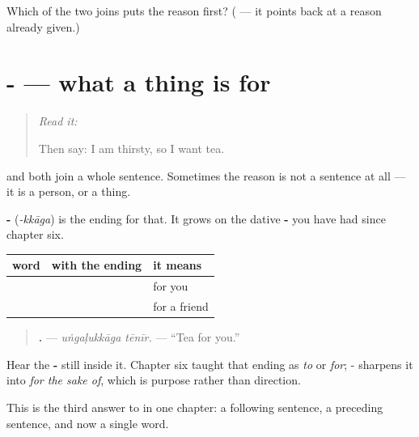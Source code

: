 \begin{tcolorbox}[breakable,colback=teal!4,colframe=teal!35!black,title={Before you move on}]
Which of the two joins puts the reason first? (\textbf{} — it points back at a reason already given.)
\end{tcolorbox}
\section[\texorpdfstring{-\ta{க்காக} (-kkāga)}{-க்காக (-kkāga)}]{- — what a thing is for}

\label{lesson:TA-C78-for-the-sake-of}



\begin{quote}
\emph{Read it:} \textbf{}

Then say: I am thirsty, so I want tea.
\end{quote}

\begin{grammarlens}[title={Grammar lens: a reason that is not a sentence}]
 and  both join a whole sentence. Sometimes the reason is not a sentence at all — it is a person, or a thing.

\textbf{-} (\emph{-kkāga}) is the ending for that. It grows on the dative \textbf{-} you have had since chapter six.

\noindent
\begin{tabularx}{\linewidth}{@{}>{\raggedright\arraybackslash}X>{\raggedright\arraybackslash}X>{\raggedright\arraybackslash}X@{}}
\toprule
\textbf{word} & \textbf{with the ending} & \textbf{it means} \\
\midrule
\ta{உங்கள்} & \textbf{\ta{உங்களுக்காக}} & for you \\
\ta{நண்பன்} & \textbf{\ta{நண்பனுக்காக}} & for a friend \\
\bottomrule
\end{tabularx}

\begin{quote}
\textbf{ .} — \emph{uṅgaḷukkāga tēnīr.} — \textquotedblleft{}Tea for you.\textquotedblright{}
\end{quote}

Hear the \textbf{-} still inside it. Chapter six taught that ending as \emph{to} or \emph{for}; - sharpens it into \emph{for the sake of}, which is purpose rather than direction.

This is the third answer to \textbf{} in one chapter: a following sentence, a preceding sentence, and now a single word.
\end{grammarlens}


